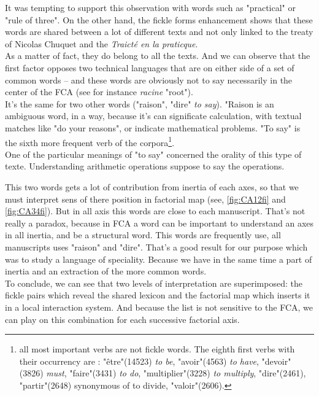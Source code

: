 \documentclass{elsarticle}
\begin{document}
It was tempting to support this observation with words such as "practical" or "rule of three". On the other hand, the fickle forms enhancement shows that these words are shared between a lot of different texts and not only linked to the treaty of Nicolas Chuquet and the \textit{Traict\'e en la praticque}.\\

As a matter of fact, they do belong to all the texts. And we can observe that the first factor opposes two technical languages that are  on either side of a set of common words -- and these words are obviously not to say necessarily in the center of the FCA (see for instance \textit{racine} "root").\\

It's the same for two other words ("raison", "dire" \textit{to say}). %
"Raison is an ambiguous word, in a way, because it's can significate calculation, with textual matches like "do your reasons", or indicate mathematical problems. "To say" is the sixth more frequent  verb of the corpora\footnote{all most important verbs are not fickle words. The eighth first verbs with their occurrency are : "être"(14523) \textit{to be}, "avoir"(4563) \textit{to have}, "devoir"(3826) \textit{must}, "faire"(3431) \textit{to do}, "multiplier"(3228) \textit{to multiply}, "dire"(2461), "partir"(2648) synonymous of to divide, "valoir"(2606).}.\\

One of the particular meanings of "to say"  concerned the orality of this type of texte. Understanding arithmetic operations suppose to say the operations.

This two words gets a lot of contribution from inertia of each  axes, so that we must interpret sens of there position in factorial map (see, \ref{fig:CA12fi} and \ref{fig:CA34fi}).
But in all axis this words are close to each manuscript. That's not really a paradox, because in FCA a word can be important to understand an axes in all inertia, and be a structural word. This words are frequently use, all manuscripts uses "raison" and "dire".
That's a good result for our purpose which was to study a language of speciality. Because we have in the same time a part of inertia and an extraction of the  more common words.\\

To conclude, we can see that two levels of interpretation are superimposed: the fickle pairs which reveal the shared lexicon and the factorial map which inserts it in a local interaction system. And because the list is not sensitive to the FCA, we can play on this combination for each successive factorial axis.
\end{document}
